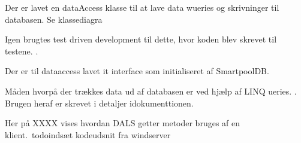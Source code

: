 Der er lavet en dataAccess klasse til at lave data wueries og skrivninger til databasen. Se klassediagra 

Igen brugtes test driven development til dette, hvor koden blev skrevet til testene.  .

Der er til dataaccess lavet it interface som initialiseret af SmartpoolDB.

Måden hvorpå der trækkes data ud af databasen er ved hjælp af LINQ ueries. . Brugen heraf er skrevet i detaljer idokumenttionen.

Her på XXXX vises hvordan DALS getter metoder bruges af en klient.\ todo{indsæt kodeudsnit fra windserver}